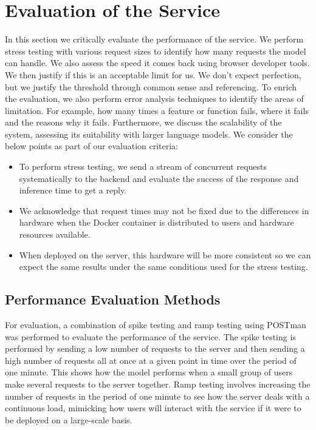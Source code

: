 \documentclass{surreydissertation}
\begin{document}
\section{Evaluation of the Service}
\label{sec:eval}
In this section we critically evaluate the performance of the service. We perform stress testing with various request sizes to identify how many requests the model can handle. We also assess the speed it comes back using browser developer tools. We then justify if this is an acceptable limit for us. We don’t expect perfection, but we justify the threshold through common sense and referencing. To enrich the evaluation, we also perform error analysis techniques to identify the areas of limitation. For example, how many times a feature or function fails, where it fails and the reasons why it fails. Furthermore, we discuss the scalability of the system, assessing its suitability with larger language models. We consider the below points as part of our evaluation criteria:

\begin{itemize}
    \item To perform stress testing, we send a stream of concurrent requests systematically to the backend and evaluate the success of the response and inference time to get a reply.
    \item We acknowledge that request times may not be fixed due to the differences in hardware when the Docker container is distributed to users and hardware resources available.
    \item When deployed on the server, this hardware will be more consistent so we can expect the same results under the same conditions used for the stress testing.
\end{itemize}

\subsection{Performance Evaluation Methods}
For evaluation, a combination of spike testing and ramp testing using POSTman~\cite{postman} was performed to evaluate the performance of the service. The spike testing is performed by sending a low number of requests to the server and then sending a high number of requests all at once at a given point in time over the period of one minute. This shows how the model performs when a small group of users make several requests to the server together. Ramp testing involves increasing the number of requests in the period of one minute to see how the server deals with a continuous load, mimicking how users will interact with the service if it were to be deployed on a large-scale basis. 
\end{document}
